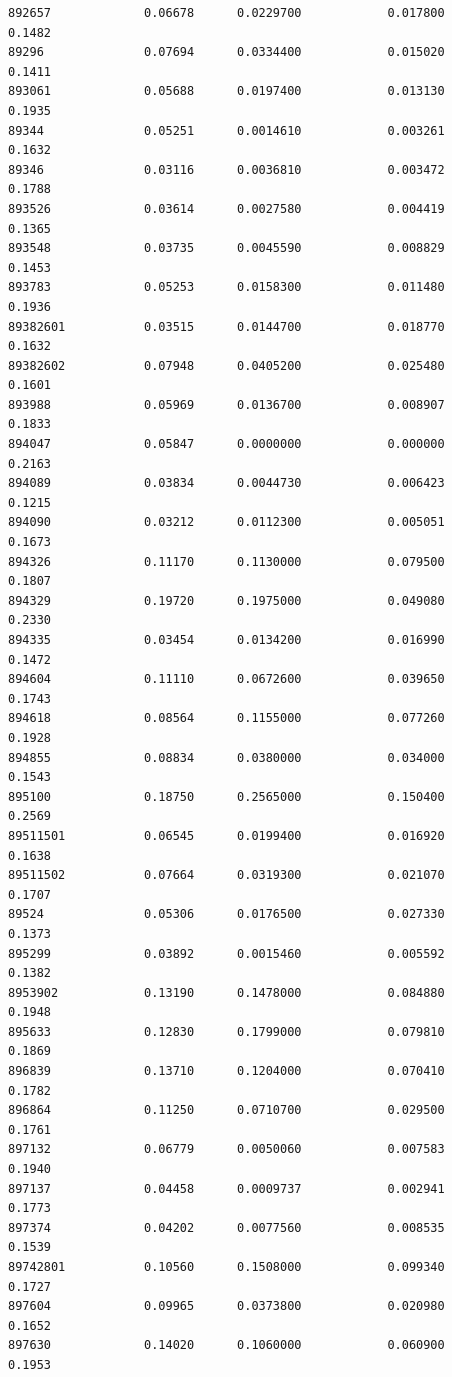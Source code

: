 \documentclass[
  letterpaper,
  DIV=11,
  numbers=noendperiod]{scrartcl}
\begin{document}
\begin{verbatim}
892657             0.06678      0.0229700            0.017800        0.1482
89296              0.07694      0.0334400            0.015020        0.1411
893061             0.05688      0.0197400            0.013130        0.1935
89344              0.05251      0.0014610            0.003261        0.1632
89346              0.03116      0.0036810            0.003472        0.1788
893526             0.03614      0.0027580            0.004419        0.1365
893548             0.03735      0.0045590            0.008829        0.1453
893783             0.05253      0.0158300            0.011480        0.1936
89382601           0.03515      0.0144700            0.018770        0.1632
89382602           0.07948      0.0405200            0.025480        0.1601
893988             0.05969      0.0136700            0.008907        0.1833
894047             0.05847      0.0000000            0.000000        0.2163
894089             0.03834      0.0044730            0.006423        0.1215
894090             0.03212      0.0112300            0.005051        0.1673
894326             0.11170      0.1130000            0.079500        0.1807
894329             0.19720      0.1975000            0.049080        0.2330
894335             0.03454      0.0134200            0.016990        0.1472
894604             0.11110      0.0672600            0.039650        0.1743
894618             0.08564      0.1155000            0.077260        0.1928
894855             0.08834      0.0380000            0.034000        0.1543
895100             0.18750      0.2565000            0.150400        0.2569
89511501           0.06545      0.0199400            0.016920        0.1638
89511502           0.07664      0.0319300            0.021070        0.1707
89524              0.05306      0.0176500            0.027330        0.1373
895299             0.03892      0.0015460            0.005592        0.1382
8953902            0.13190      0.1478000            0.084880        0.1948
895633             0.12830      0.1799000            0.079810        0.1869
896839             0.13710      0.1204000            0.070410        0.1782
896864             0.11250      0.0710700            0.029500        0.1761
897132             0.06779      0.0050060            0.007583        0.1940
897137             0.04458      0.0009737            0.002941        0.1773
897374             0.04202      0.0077560            0.008535        0.1539
89742801           0.10560      0.1508000            0.099340        0.1727
897604             0.09965      0.0373800            0.020980        0.1652
897630             0.14020      0.1060000            0.060900        0.1953

\end{verbatim}
\end{document}
